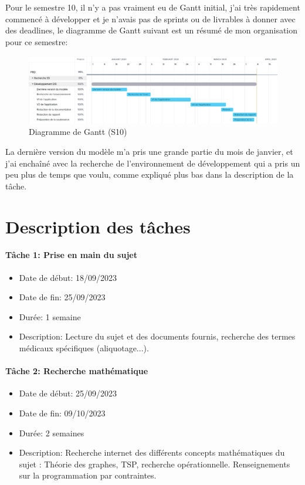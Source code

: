 \documentclass{polytech/polytech}
\numberwithin{figure}{chapter}
\begin{document}
\begin{appendix}
Pour le semestre 10, il n'y a pas vraiment eu de Gantt initial, j'ai très rapidement commencé à développer et je n'avais pas de sprints ou de livrables à donner avec des deadlines, le diagramme de Gantt suivant est un résumé de mon organisation pour ce semestre:

\begin{figure}[ht]
    \centering
    \includegraphics[width=\textwidth]{pic/gantts10.png}
    \caption{Diagramme de Gantt (S10)}
\end{figure}

La dernière version du modèle m'a pris une grande partie du mois de janvier, et j'ai enchaîné avec la recherche de l'environnement de développement qui a pris un peu plus de temps que voulu, comme expliqué plus bas dans la description de la tâche.

\section{Description des tâches}

\paragraph{Tâche 1: Prise en main du sujet}

\begin{itemize}
    \item Date de début: 18/09/2023
    \item Date de fin: 25/09/2023
    \item Durée: 1 semaine
    \item
        Description: Lecture du sujet et des documents fournis, recherche des termes médicaux spécifiques (aliquotage...).
\end{itemize}

\paragraph{Tâche 2: Recherche mathématique}

\begin{itemize}
    \item Date de début: 25/09/2023
    \item Date de fin: 09/10/2023
    \item Durée: 2 semaines
    \item
        Description: Recherche internet des différents concepts mathématiques du sujet : Théorie des graphes, TSP, recherche opérationnelle. Renseignements sur la programmation par contraintes.
\end{itemize}


\end{appendix}
\end{document}
